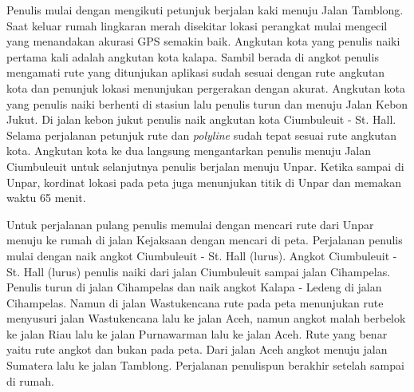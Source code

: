 			\hspace{0.5cm}Penulis mulai dengan mengikuti petunjuk berjalan kaki menuju Jalan Tamblong. Saat keluar rumah lingkaran merah disekitar lokasi perangkat mulai mengecil yang menandakan akurasi GPS semakin baik. Angkutan kota yang penulis naiki pertama kali adalah angkutan kota kalapa. Sambil berada di angkot penulis mengamati rute yang ditunjukan aplikasi sudah sesuai dengan rute angkutan kota dan penunjuk lokasi menunjukan pergerakan dengan akurat. Angkutan kota yang penulis naiki berhenti di stasiun lalu penulis turun dan menuju Jalan Kebon Jukut. Di jalan kebon jukut penulis naik angkutan kota Ciumbuleuit - St. Hall. Selama perjalanan petunjuk rute dan \textit{polyline} sudah tepat sesuai rute angkutan kota. Angkutan kota ke dua langsung mengantarkan penulis menuju Jalan Ciumbuleuit untuk selanjutnya penulis berjalan menuju Unpar. Ketika sampai di Unpar, kordinat lokasi pada peta juga menunjukan titik di Unpar dan memakan waktu 65 menit.
			
			\hspace{0.5cm}Untuk perjalanan pulang penulis memulai dengan mencari rute dari Unpar menuju ke rumah di jalan Kejaksaan dengan mencari di peta. Perjalanan penulis mulai dengan naik angkot Ciumbuleuit - St. Hall (lurus). Angkot Ciumbuleuit - St. Hall (lurus) penulis naiki dari jalan Ciumbuleuit sampai jalan Cihampelas. Penulis turun di jalan Cihampelas dan naik angkot Kalapa - Ledeng di jalan Cihampelas. Namun di jalan Wastukencana rute pada peta menunjukan rute menyusuri jalan Wastukencana lalu ke jalan Aceh, namun angkot malah berbelok ke jalan Riau lalu ke jalan Purnawarman lalu ke jalan Aceh. Rute yang benar yaitu rute angkot dan bukan pada peta. Dari jalan Aceh angkot menuju jalan Sumatera lalu ke jalan Tamblong. Perjalanan penulispun berakhir setelah sampai di rumah.\\
		

